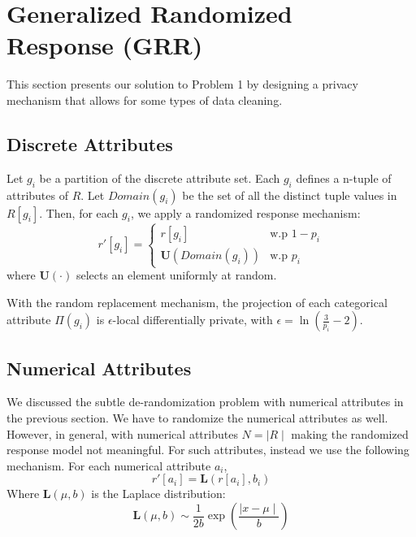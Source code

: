 \section{Generalized Randomized \\ Response (GRR)}
This section presents our solution to Problem 1 by designing a privacy mechanism that allows for some types of data cleaning.

\subsection{Discrete Attributes}
Let $g_i$ be a partition of the discrete attribute set.
Each $g_i$ defines a n-tuple of attributes of $R$.
Let $Domain(g_i)$ be the set of all the distinct tuple values in $R[g_i]$.
Then, for each $g_i$, we apply a randomized response mechanism:
\[
r'[g_i] = \begin{cases} r[g_i] & \text{w.p } 1-p_i \\ 
\mathbf{U}(Domain(g_i)) & \text{w.p } p_i \end{cases}
\]
where $\mathbf{U}(\cdot)$ selects an element uniformly at random. 

\begin{lemma}
With the random replacement mechanism, the projection of each categorical attribute $\Pi(g_i)$ is $\epsilon$-local differentially private, with $\epsilon = \ln (\frac{3}{p_i} - 2)$. 
\end{lemma}

\iffalse
\begin{proof}
Let $N = \mid Domain(g_i) \mid$:
\[
\epsilon = \ln \frac{1-p_i + p_i \frac{1}{N}}{p_i \frac{N-1}{N}}
\] 
The worst case is when there are only two values in the domain and all of the other entries in the database are one value except for one, then this gives us $N=2$, plugging it in to the above formula:
\[\epsilon = \ln (\frac{3}{p_i} - 2)\]
\end{proof}
\fi

\subsection{Numerical Attributes}
We discussed the subtle de-randomization problem with numerical attributes in the previous section.
We have to randomize the numerical attributes as well.
However, in general, with numerical attributes $N = \mid R \mid$ making the randomized response model not meaningful.
For such attributes, instead we use the following mechanism.
For each numerical attribute $a_i$, 
\[
r'[a_i] = \mathbf{L}(r[a_i],b_i)
\]
Where $\mathbf{L}(\mu,b)$ is the Laplace distribution:
\[
\mathbf{L}(\mu,b) \sim \frac{1}{2b}\exp (\frac{\mid x - \mu\mid}{b})
\]

